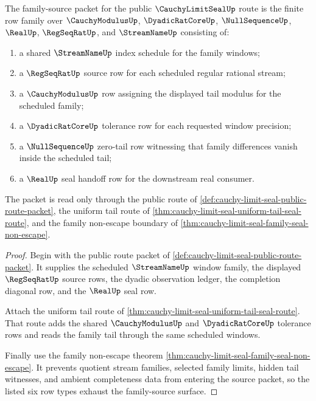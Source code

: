 \begin{theorem}
\label{thm:cauchy-limit-seal-uniform-family-source}
The family-source packet for the public $\CauchyLimitSealUp$ route is the finite row family over $\CauchyModulusUp$, $\DyadicRatCoreUp$, $\NullSequenceUp$, $\RealUp$, $\RegSeqRatUp$, and $\StreamNameUp$ consisting of:
\begin{enumerate}
\item a shared $\StreamNameUp$ index schedule for the family windows;
\item a $\RegSeqRatUp$ source row for each scheduled regular rational stream;
\item a $\CauchyModulusUp$ row assigning the displayed tail modulus for the scheduled family;
\item a $\DyadicRatCoreUp$ tolerance row for each requested window precision;
\item a $\NullSequenceUp$ zero-tail row witnessing that family differences vanish inside the scheduled tail;
\item a $\RealUp$ seal handoff row for the downstream real consumer.
\end{enumerate}
The packet is read only through the public route of \autoref{def:cauchy-limit-seal-public-route-packet}, the uniform tail route of \autoref{thm:cauchy-limit-seal-uniform-tail-seal-route}, and the family non-escape boundary of \autoref{thm:cauchy-limit-seal-family-seal-non-escape}.
\end{theorem}
\begin{proof}
Begin with the public route packet of \autoref{def:cauchy-limit-seal-public-route-packet}. It supplies the scheduled $\StreamNameUp$ window family, the displayed $\RegSeqRatUp$ source rows, the dyadic observation ledger, the completion diagonal row, and the $\RealUp$ seal row.

Attach the uniform tail route of \autoref{thm:cauchy-limit-seal-uniform-tail-seal-route}. That route adds the shared $\CauchyModulusUp$ and $\DyadicRatCoreUp$ tolerance rows and reads the family tail through the same scheduled windows.

Finally use the family non-escape theorem \autoref{thm:cauchy-limit-seal-family-seal-non-escape}. It prevents quotient stream families, selected family limits, hidden tail witnesses, and ambient completeness data from entering the source packet, so the listed six row types exhaust the family-source surface.
\end{proof}

